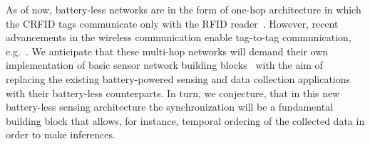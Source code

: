 \documentclass[journal,draftcls,onecolumn,12pt,twoside]{IEEEtranTCOM}
\begin{document}
 As of now, battery-less networks are in the form of one-hop architecture in which the CRFID tags communicate only with the RFID reader~\cite{wisp,booksmith2013,wisent:2016}. However, recent advancements in the wireless communication enable tag-to-tag communication, e.g.~\cite{liu2013ambient}. We anticipate that these multi-hop networks will demand their own implementation of basic sensor network building blocks~\cite{levis:tinyos} with the aim of replacing the existing battery-powered sensing and data collection applications with their battery-less counterparts. In turn, we conjecture, that in this new battery-less sensing architecture the synchronization will be a fundamental building block that allows, for instance, temporal ordering of the collected data in order to make inferences.

\end{document}
